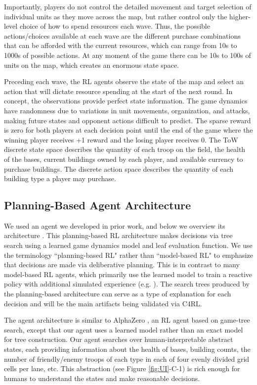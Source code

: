 \documentclass[letterpaper]{article} %
\begin{document}
Importantly, players do not control the detailed movement and target selection of individual units as they move across the map, but rather control only the higher-level choice of how to spend resources each wave. Thus, the possible actions/choices available at each wave are the different purchase combinations that can be afforded with the current resources, which can range from 10s to 1000s of possible actions. At any moment of the game there can be 10s to 100s of units on the map, which  creates an enormous state space.

Preceding each wave, the RL agents observe the state of the map and select an action that will dictate resource spending at the start of the next round.
In concept, the observations provide perfect state information.
The game dynamics have randomness due to variations in unit movements, organization, and attacks, making future states and opponent actions difficult to predict. The sparse reward is zero for both players at each decision point until the end of the game where the winning player receives +1 reward and the losing player receives 0.
The ToW discrete state space describes the quantity of each troop on the field, the health of the bases, current buildings owned by each player, and available currency to purchase buildings.
The discrete action space describes the quantity of each building type a player may purchase.

\subsection{Planning-Based Agent Architecture}
\label{sec:architecture}

We used an agent we developed in prior work, and below we overview its architecture \cite{lam2021identifying}.
This planning-based RL architecture makes decisions via tree search using a learned game dynamics model and leaf evaluation function. We use the terminology ``planning-based RL" rather than ``model-based RL" to emphasize that decisions are made via deliberative planning. This is in contrast to many model-based RL agents, which primarily use the learned model to train a reactive policy with additional simulated experience (e.g. \cite{sutton1990, kaiser2020}). The search trees produced by the planning-based architecture can serve as a type of explanation for each decision and will be the main artifacts being validated via C4RL. 


The agent architecture is similar to AlphaZero \cite{silver2018}, an RL agent based on game-tree search, except that our agent uses a learned model rather than an exact model for tree construction.  
Our agent searches over human-interpretable abstract states, each providing information about the health of bases, building counts, the number of friendly/enemy troops of each type in each of four evenly divided grid cells per lane, etc.
This abstraction (see Figure \ref{fig:UI}-C-1) is rich enough for humans to understand the states and make reasonable decisions. 
\end{document}
